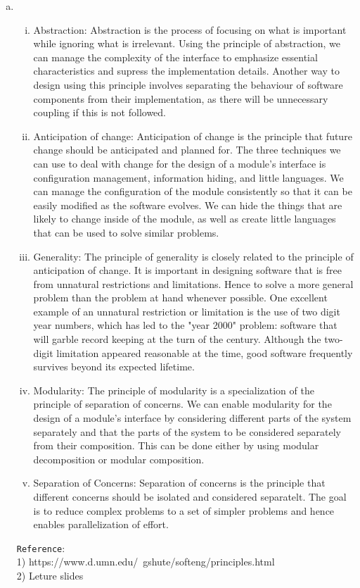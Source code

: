 \documentclass[12pt]{article}
\begin{document}
\begin{enumerate}[a)]
\item
\begin{enumerate}[i.]
\item Abstraction: Abstraction is the process of focusing on what is important while ignoring what is irrelevant. Using the principle of abstraction, we can manage the complexity of the interface to emphasize essential characteristics and supress the implementation details. Another way to design using this principle involves separating the behaviour of software components from their implementation, as there will be unnecessary coupling if this is not followed.
\item Anticipation of change: Anticipation of change is the principle that future change should be anticipated and planned for. The three techniques we can use to deal with change for the design of a module’s interface is configuration management, information hiding, and little languages. We can manage the configuration of the module consistently so that it can be easily modified as the software evolves. We can hide the things that are likely to change inside of the module, as well as create little languages that can be used to solve similar problems.
\item Generality: The principle of generality is closely related to the principle of anticipation of change. It is important in designing software that is free from unnatural restrictions and limitations. Hence to solve a more general problem than the problem at hand whenever possible. One excellent example of an unnatural restriction or limitation is the use of two digit year numbers, which has led to the "year 2000" problem: software that will garble record keeping at the turn of the century. Although the two-digit limitation appeared reasonable at the time, good software frequently survives beyond its expected lifetime.
\item Modularity: The principle of modularity is a specialization of the principle of separation of concerns. We can enable modularity for the design of a module’s interface by considering different parts of the system separately and that the parts of the system to be considered separately from their composition. This can be done either by using modular decomposition or modular composition.
\item Separation of Concerns: Separation of concerns is the principle that different concerns should be isolated and considered separatelt. The goal is to reduce complex problems to a set of simpler problems and hence enables parallelization of effort.\\
\end{enumerate}

\texttt{Reference}:\\
1) https://www.d.umn.edu/~gshute/softeng/principles.html\\
2) Leture slides



\end{enumerate}
\end{document}
